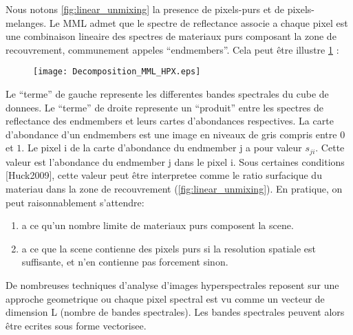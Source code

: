 Nous notons \ref{fig:linear_unmixing}  la
presence de pixels-purs et de pixels-melanges. Le MML admet que le
spectre de reflectance associe a chaque pixel est une combinaison
lineaire des spectres de materiaux purs composant la zone de
recouvrement, communement appeles ``endmembers''. Cela peut être
illustre \ref{fig:decomp_mml} :

\begin{figure}[h]
  \centering
  \texttt{[image: Decomposition\_MML\_HPX.eps]}
  \label{fig:decomp_mml}
\end{figure}

Le ``terme'' de gauche represente les differentes bandes spectrales du
cube de donnees. Le ``terme'' de droite represente un ``produit''
entre les spectres de reflectance des endmembers et leurs cartes
d'abondances respectives. La carte d'abondance d'un endmembers est une
image en niveaux de gris compris entre $0$ et $1$. Le pixel i de la carte
d'abondance du endmember j a pour valeur $s_{ji}$. Cette valeur est
l'abondance du endmember j dans le pixel i. Sous certaines conditions
[Huck2009], cette valeur peut être interpretee comme le ratio
surfacique du materiau dans la zone de recouvrement (\ref{fig:linear_unmixing}).  En
pratique, on peut raisonnablement s'attendre: 

\begin{enumerate}
\item{a ce qu'un nombre
limite de materiaux purs composent la scene.}
\item{a ce que la scene
contienne des pixels purs si la resolution spatiale est suffisante, et
n'en contienne pas forcement sinon.}
\end{enumerate}
 
De nombreuses techniques d'analyse d'images hyperspectrales reposent
sur une approche geometrique ou chaque pixel spectral est vu comme un
vecteur de dimension L (nombre de bandes spectrales). Les
bandes spectrales peuvent alors être ecrites sous forme vectorisee.

\begin{figure}[h]
\label{fig:mml}
\end{figure}

